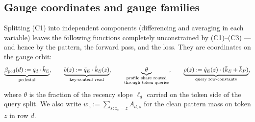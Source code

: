 \documentclass{article}
\begin{document}
\subsection{Gauge coordinates and gauge families}

Splitting (C1) into independent components (differencing and averaging in each variable) leaves the following functions completely unconstrained by (C1)--(C3) --- and hence by the pattern, the forward pass, and the loss. They are coordinates on the gauge orbit:
\begin{equation}\label{eq:gaugecoords}
    \underbrace{\beta_{\mathrm{ped}}(d) := q_d \cdot \bar k_E}_{\text{pedestal}}, \qquad
    \underbrace{b(z) := \bar q_E \cdot \hat k_E(z)}_{\text{key-content read}}, \qquad
    \underbrace{\theta}_{\substack{\text{profile share routed}\\ \text{through token queries}}}, \qquad
    \underbrace{\rho(z) := \hat q_E(z)\cdot(\bar k_E + \bar k_P)}_{\text{query row-constants}} ,
\end{equation}
where $\theta$ is the fraction of the recency slope $\ell_d$ carried on the token side of the query split. We also write $w_z := \sum_{s: z_s = z} A_{d,s}$ for the clean pattern mass on token $z$ in row $d$.
\end{document}
